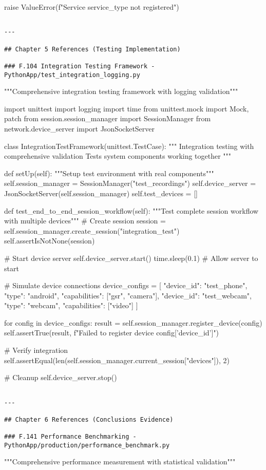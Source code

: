 \documentclass[12pt,a4paper]{report}
\begin{document}
        raise ValueError(f"Service {service\_type} not registered")
\begin{verbatim}

---

## Chapter 5 References (Testing Implementation)

### F.104 Integration Testing Framework - PythonApp/test_integration_logging.py

\end{verbatim}
"""Comprehensive integration testing framework with logging validation"""

import unittest
import logging
import time
from unittest.mock import Mock, patch
from session.session\_manager import SessionManager
from network.device\_server import JsonSocketServer


class IntegrationTestFramework(unittest.TestCase):
    """
    Integration testing with comprehensive validation
    Tests system components working together
    """

    def setUp(self):
        """Setup test environment with real components"""
        self.session\_manager = SessionManager("test\_recordings")
        self.device\_server = JsonSocketServer(self.session\_manager)
        self.test\_devices = []

    def test\_end\_to\_end\_session\_workflow(self):
        """Test complete session workflow with multiple devices"""
        \# Create session
        session = self.session\_manager.create\_session("integration\_test")
        self.assertIsNotNone(session)

        \# Start device server
        self.device\_server.start()
        time.sleep(0.1)  \# Allow server to start

        \# Simulate device connections
        device\_configs = [
            {"device\_id": "test\_phone", "type": "android", "capabilities": ["gsr", "camera"]},
            {"device\_id": "test\_webcam", "type": "webcam", "capabilities": ["video"]}
        ]

        for config in device\_configs:
            result = self.session\_manager.register\_device(config)
            self.assertTrue(result, f"Failed to register device {config['device\_id']}")

        \# Verify integration
        self.assertEqual(len(self.session\_manager.current\_session["devices"]), 2)

        \# Cleanup
        self.device\_server.stop()
\begin{verbatim}

---

## Chapter 6 References (Conclusions Evidence)

### F.141 Performance Benchmarking - PythonApp/production/performance_benchmark.py

\end{verbatim}
"""Comprehensive performance measurement with statistical validation"""
\end{document}
